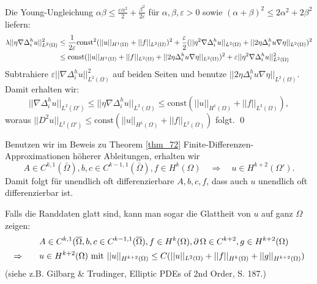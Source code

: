 \begin{enumerate}[1.]
		Die Young-Ungleichung $\alpha \beta \leq \frac{\varepsilon \alpha^2}{2} + \frac{\beta^2}{2\varepsilon}$ für $\alpha, \beta, \varepsilon > 0$ sowie $(\alpha + \beta)^2 \leq 2\alpha^2 + 2\beta^2$ liefern:
		\begin{equation}
		\begin{aligned}
			\lambda ||\eta \nabla \Delta_i^h u||_{L^2(\Omega)}^2 &\leq \frac{1}{2\varepsilon} \text{const}^2(||u||_{H^1(\Omega)} + ||f||_{L^2(\Omega)})^2 + \frac{\varepsilon}{2}(||\eta^2 \nabla \Delta_i^hu||_{L^2(\Omega)} + ||2 \eta \Delta_i^h u \nabla \eta||_{L^2(\Omega)})^2 \\ \notag
			&\leq \text{const}(||u||_{H^1(\Omega)} + ||f||_{L^2(\Omega)} + ||2 \eta \Delta_i^h u \nabla \eta||_{L^2(\Omega)})^2 + \varepsilon||\eta^2 \nabla \Delta_i^hu ||_{L^2(\Omega)}^2
		\end{aligned}
		\end{equation}
		Subtrahiere $\varepsilon ||\nabla \Delta_i^h u||_{L^2(\Omega)}^2$ auf beiden Seiten und benutze $||2 \eta \Delta_i^h u \nabla \eta||_{L^2(\Omega)}$. Damit erhalten wir:
		\[ ||\nabla \Delta_i^h u||_{L^2(\Omega')} \leq ||\eta \nabla \Delta_i^h u||_{L^2(\Omega)} \leq \text{const}(||u||_{H^1(\Omega)} + ||f||_{L^2(\Omega)}), \]
		woraus $||D^2u||_{L^2(\Omega')} \leq \text{const}(||u||_{H^1(\Omega)} + ||f||_{L^2(\Omega)})$ folgt. \qed
	\end{enumerate}
	
\begin{bem} \label{bem_73}
	Benutzen wir im Beweis zu Theorem \ref{thm_72} Finite-Differenzen-Approximationen höherer Ableitungen, erhalten wir \marginnote{[73]}
	\[ A \in C^{k,1}(\bar{\Omega}),b,c \in C^{k-1,1}(\bar{\Omega}),f \in H^k(\Omega) \quad \Rightarrow \quad u \in H^{k+2}(\Omega'). \]
	Damit folgt für unendlich oft differenzierbare $A,b,c,f$, dass auch $u$ unendlich oft differenzierbar ist.
\end{bem}
	
\begin{bem} \label{bem_74}
	Falls die Randdaten glatt sind, kann man sogar die Glattheit von $u$ auf ganz $\Omega$ zeigen: \marginnote{[74]}
	\begin{equation}
	\begin{aligned}
		& A \in C^{k,1}(\overline{\Omega}, b,c \in C^{k-1,1}(\overline{\Omega}),f \in H^k(\Omega), \operatorname{\partial}\Omega \in C^{k+2}, g \in H^{k+2}(\Omega) \\ \notag
		\Rightarrow \qquad & u \in H^{k+2}(\Omega) \text{ mit } ||u||_{H^{k+2}(\Omega)} \leq C(||u||_{L^2(\Omega)} + ||f||_{H^k(\Omega)} + ||g||_{H^{k+2}(\Omega)})
	\end{aligned}
	\end{equation}
	(siehe z.B. Gilbarg \& Trudinger, \glqq Elliptic PDEs of 2nd Order\grqq, S. 187.)
\end{bem}
\newpage
